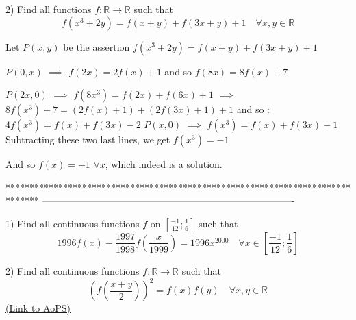 \begin{solution}
	\begin{tcolorbox}2) Find all  functions $f:\mathbb{R}\to\mathbb{R}$   such that
\[f\left ( x^{3}+2y \right )=f(x+y)+f(3x+y) +1 \quad \forall x,y \in \mathbb{R}\]\end{tcolorbox}
Let $P(x,y)$ be the assertion $f(x^3+2y)=f(x+y)+f(3x+y)+1$

$P(0,x)$ $\implies$ $f(2x)=2f(x)+1$ and so $f(8x)=8f(x)+7$

$P(2x,0)$ $\implies$ $f(8x^3)=f(2x)+f(6x)+1$ $\implies$ $8f(x^3)+7=(2f(x)+1)+(2f(3x)+1)+1$ and so :
$4f(x^3)=f(x)+f(3x)-2$ 
$P(x,0)$ $\implies$ $f(x^3)=f(x)+f(3x)+1$ 
Subtracting these two last lines, we get $f(x^3)=-1$

And so $\boxed{f(x)=-1}$ $\forall x$, which indeed is a solution.
\end{solution}
*******************************************************************************
-------------------------------------------------------------------------------

\begin{problem}
	1) Find all continuous functions $f$ on $\left [ \frac{-1}{12};\frac{1}{6} \right ]$ such that 
\[1996f(x)-\frac{1997}{1998}f\left ( \frac{x}{1999} \right )=1996x^{2000} \quad \forall x \in  \left [ \frac{-1}{12};\frac{1}{6} \right ]\]


2) Find all continuous functions $f:\mathbb{R}\to\mathbb{R}$  such that
\[\left ( f\left ( \frac{x+y}{2} \right ) \right )^{2}=f(x)f(y) \quad \forall x,y \in \mathbb{R}\]
	\flushright \href{https://artofproblemsolving.com/community/c6h563768}{(Link to AoPS)}
\end{problem}



